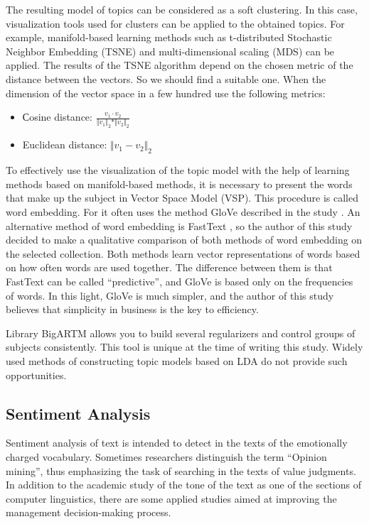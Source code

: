 \documentclass[12pt]{report}
\theoremstyle{definition}
\begin{document}
The resulting model of topics can be considered as a soft clustering. 
In this case, visualization tools used for clusters can be applied to the obtained topics. 
For example, manifold-based learning methods such as t-distributed Stochastic Neighbor Embedding (TSNE) and multi-dimensional scaling  (MDS) can be applied. 
The results of the TSNE algorithm depend on the chosen metric of the distance between the vectors. So we should find a suitable one.
When the dimension of the vector space in a few hundred use the following metrics:

\begin{itemize}
	\item 	Сosine distance: $ \frac{v_1 \cdot v_2}{\Vert v_1 \Vert_2 * \Vert v_2 \Vert_2 } $
	\item 	Euclidean distance: $ \Vert v_1 - v_2 \Vert_2$
\end{itemize}

To effectively use the visualization of the topic model with the help of learning methods based on manifold-based methods, it is necessary to present the words that make up the subject in Vector Space Model (VSP). 
This procedure is called word embedding. 
For it often uses the method GloVe described in the study \cite{pennington2014glove}. 
An alternative method of word embedding is FastText \cite{joulin2016bag}, so the author of this study decided to make a qualitative comparison of both methods of word embedding on the selected collection. 
Both methods learn vector representations of words based on how often words are used together. 
The difference between them is that FastText can be called ``predictive'', and GloVe is based only on the frequencies of words. 
In this light, GloVe is much simpler, and the author of this study believes that simplicity in business is the key to efficiency.

Library BigARTM \cite{ianina2017multi} allows you to build several regularizers and control groups of subjects consistently. 
This tool is unique at the time of writing this study. 
Widely used methods of constructing topic models based on LDA do not provide such opportunities.

\subsection{Sentiment Analysis}
Sentiment analysis of text is intended to detect in the texts of the emotionally charged vocabulary. 
Sometimes researchers distinguish the term ``Opinion mining'', thus emphasizing the task of searching in the texts of value judgments. 
In addition to the academic study of the tone of the text as one of the sections of computer linguistics, there are some applied studies aimed at improving the management decision-making process.
\end{document}

